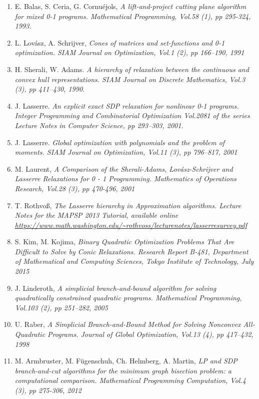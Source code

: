 \documentclass[12pt]{book}
\theoremstyle{definition}
\begin{document}
\begin{enumerate}
\item E. Balas, S. Ceria, G. Cornuéjols, \it A lift-and-project cutting plane algorithm
for mixed 0-1 programs. \rm Mathematical Programming, Vol.58 (1), pp 295-324, 1993.
\label{BalasLiftandProjectCuttingPlane}
%
\item L. Lovász, A. Schrijver, \it Cones of matrices and set-functions and 0-1 optimization. \rm
SIAM Journal on Optimization, Vol.1 (2), pp 166–190, 1991
\label{LovaszSchriverHrierarchy}
%
\item H. Sherali, W. Adams. \it A hierarchy of relaxation between the continuous
and convex hull representations. \rm SIAM Journal on Discrete Mathematics, Vol.3 (3), pp 411–430, 1990.
\label{SheraliAdamsHierarchy}
%
\item  J. Lasserre. \it An explicit exact SDP relaxation for nonlinear 0-1 programs. \rm Integer Programming and Combinatorial Optimization
Vol.2081 of the series Lecture Notes in Computer Science, pp 293–303, 2001.
\label{LasserreExplicitExactSDP}
%
\item  J. Lasserre. \it Global optimization with polynomials and the problem of moments. \rm
SIAM Journal on Optimization,  Vol.11 (3), pp 796–817, 2001
\label{LasserreProblemOfMoments}
%
\item M. Laurent, \it A Comparison of the Sherali-Adams, Lovász-Schrijver and Lasserre Relaxations for 0 - 1 Programming. \rm Mathematics of Operations Research, Vol.28 (3), pp 470-496, 2001
\label{LaurentComparisonOfHierarchies}
% 
\item T. Rothvoß, \it The Lasserre hierarchy in Approximation algorithms. \rm
Lecture Notes for the MAPSP 2013 Tutorial, available online
\url{https://www.math.washington.edu/~rothvoss/lecturenotes/lasserresurvey.pdf}
\label{RothLassereSurvey}
%
\item S. Kim, M. Kojima, \it Binary Quadratic Optimization Problems
That Are Difficult to Solve by Conic Relaxations. \rm 
Research Report B-481, Department of Mathematical
and Computing Sciences, Tokyo Institute of Technology, July 2015
\label{KimKojimaDifficultBinaryOptimProblems}




\item J. Linderoth, \it A simplicial branch-and-bound algorithm for solving quadratically constrained quadratic programs. \rm 
Mathematical Programming, Vol.103 (2), pp 251–282, 2005
\label{LinderothSimplicialBranchAndBound}
%
\item U. Raber, \it A Simplicial Branch-and-Bound Method for Solving Nonconvex All-Quadratic Programs. \rm
Journal of Global Optimization, Vol.13 (4), pp 417–432, 1998
\label{RaberSimplicialBranchAndBound}
%
\item M. Armbruster, M. Fügenschuh, Ch. Helmberg, A. Martin, \it LP and SDP branch-and-cut algorithms for the minimum graph bisection problem: a computational comparison. \rm Mathematical Programming Computation, Vol.4 (3), pp 275-306, 2012
\label{ComparativeBNBStudyForGP}






\end{enumerate}
\end{document}
